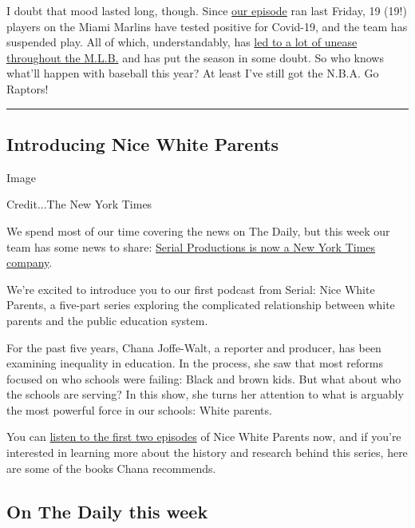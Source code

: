 I doubt that mood lasted long, though. Since
\href{https://www.nytimes.com/2020/07/24/podcasts/the-daily/mlb-baseball-season-coronavirus.html?action=click\&module=audio-series-bar\&region=header\&pgtype=Article}{our
episode} ran last Friday, 19 (19!) players on the Miami Marlins have
tested positive for Covid-19, and the team has suspended play. All of
which, understandably, has
\href{https://www.nytimes.com/2020/07/28/sports/baseball/marlins-outbreak-mlb-coronavirus.html}{led
to a lot of unease throughout the M.L.B.} and has put the season in some
doubt. So who knows what'll happen with baseball this year? At least
I've still got the N.B.A. Go Raptors!

\begin{center}\rule{0.5\linewidth}{\linethickness}\end{center}

\hypertarget{introducing-nice-white-parents}{%
\subsection{Introducing Nice White
Parents}\label{introducing-nice-white-parents}}

Image

Credit...The New York Times

We spend most of our time covering the news on The Daily, but this week
our team has some news to share:
\href{https://www.nytimes.com/2020/07/22/business/media/new-york-times-serial.html}{Serial
Productions is now a New York Times company}.

We're excited to introduce you to our first podcast from Serial: Nice
White Parents, a five-part series exploring the complicated relationship
between white parents and the public education system.

For the past five years, Chana Joffe-Walt, a reporter and producer, has
been examining inequality in education. In the process, she saw that
most reforms focused on who schools were failing: Black and brown kids.
But what about who the schools are serving? In this show, she turns her
attention to what is arguably the most powerful force in our schools:
White parents.

You can
\href{https://www.nytimes.com/2020/07/30/podcasts/nice-white-parents-serial.html}{listen
to the first two episodes} of Nice White Parents now, and if you're
interested in learning more about the history and research behind this
series, here are some of the books Chana recommends.

\hypertarget{on-the-daily-this-week}{%
\subsection{On The Daily this week}\label{on-the-daily-this-week}}

